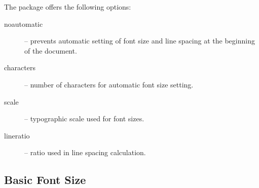 \documentclass{ltugboat}
\begin{document}
The  package offers the following options:

\begin{description}
  \item[noautomatic] – prevents automatic setting of font size and line spacing
    at the beginning of the document.
  \item[characters] – number of characters for automatic font size setting.
  \item[scale] – typographic scale used for font sizes.
  \item[lineratio] – ratio used in line spacing calculation.
\end{description}

\subsection{Basic Font Size}
\end{document}
